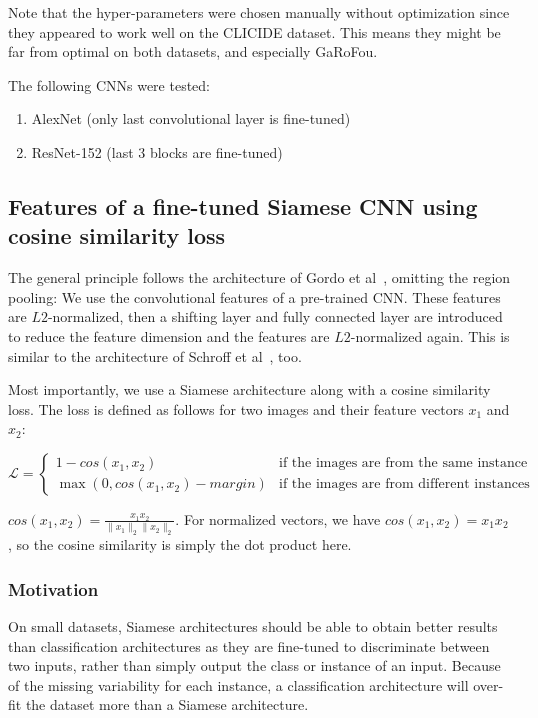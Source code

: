 \documentclass[fleqn]{article}
\begin{document}
Note that the hyper-parameters were chosen manually without optimization
since they appeared to work well on the CLICIDE dataset. This means they
might be far from optimal on both datasets, and especially GaRoFou.

The following CNNs were tested:
\begin{enumerate}
    \item AlexNet (only last convolutional layer is fine-tuned)
    \item ResNet-152 (last 3 blocks are fine-tuned)
\end{enumerate}

\subsection{Features of a fine-tuned Siamese CNN using cosine similarity loss}
The general principle follows the architecture of
Gordo et al~\cite{gordo_deep_2016}, omitting the region pooling:
We use the convolutional features of a pre-trained CNN.
These features are $L2$-normalized, then a shifting layer and
fully connected layer are introduced to reduce the
feature dimension and the features are
$L2$-normalized again. This is similar to the architecture of
Schroff et al~\cite{schroff_facenet:_2015}, too.

Most importantly, we use a Siamese architecture along with a cosine
similarity loss. The loss is defined as follows for two images and
their feature vectors $x_1$ and $x_2$:

\begin{equation}
\mathcal{L} =
\begin{cases}
1 - cos(x_1, x_2) & \text{if the images are from the same instance}\\
\max(0, cos(x_1, x_2) - margin) & \text{if the images are from different instances}
\end{cases}
\end{equation}

$cos(x_1, x_2) = \frac{x_1 x_2}{\|x_1\|_2 \|x_2\|_2}$. For normalized
vectors, we have $cos(x_1, x_2) = x_1 x_2$, so the cosine similarity is
simply the dot product here.

\subsubsection{Motivation}
On small datasets, Siamese architectures should be able to obtain better
results than classification architectures as they are fine-tuned to
discriminate between two inputs, rather than simply output the class or
instance of an input.
Because of the missing variability for each instance, a classification
architecture will over-fit the dataset more than a Siamese architecture.
\end{document}
